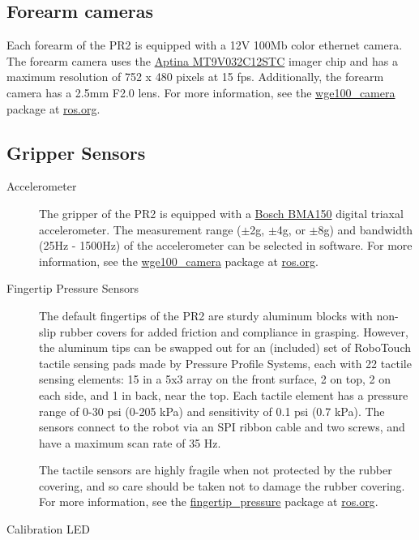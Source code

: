 \subsection{Forearm cameras}
Each forearm of the PR2 is equipped with a 12V 100Mb color ethernet camera. The
forearm camera uses the
\href{http://www.aptina.com/products/image_sensors/mt9v032c12stc/#overview}{Aptina
  MT9V032C12STC} imager chip and has a maximum resolution of 752 x 480 pixels at
15 fps. Additionally, the forearm camera has a 2.5mm F2.0 lens.  For more
information, see the
\href{http://www.ros.org/wiki/wge100_camera}{wge100\_camera} package at
\href{http://www.ros.org}{ros.org}.

\subsection{Gripper Sensors}
\begin{description}

\item[Accelerometer] The gripper of the PR2 is equipped with a
  \href{http://www.bosch-sensortec.com/content/language1/html/3474.htm}{Bosch
    BMA150} digital triaxal accelerometer. The measurement range ($\pm$2g,
  $\pm$4g, or $\pm$8g) and bandwidth (25Hz - 1500Hz) of the accelerometer can be
  selected in software. For more information, see the
  \href{http://www.ros.org/wiki/wge100_camera}{wge100\_camera} package at
  \href{http://www.ros.org}{ros.org}.

\item[Fingertip Pressure Sensors] The default fingertips of the PR2 are sturdy
  aluminum blocks with non-slip rubber covers for added friction and compliance
  in grasping.  However, the aluminum tips can be swapped out for an (included)
  set of RoboTouch tactile sensing pads made by Pressure Profile Systems, each
  with 22 tactile sensing elements: 15 in a 5x3 array on the front surface, 2 on
  top, 2 on each side, and 1 in back, near the top.  Each tactile element has a
  pressure range of 0-30 psi (0-205 kPa) and sensitivity of 0.1 psi (0.7 kPa).
  The sensors connect to the robot via an SPI ribbon cable and two screws, and
  have a maximum scan rate of 35 Hz.

The tactile sensors are highly fragile when not protected by the rubber
covering, and so care should be taken not to damage the rubber covering.  For
more information, see the
\href{http://www.ros.org/wiki/fingertip\_pressure}{fingertip\_pressure} package
at \href{http://ros.org}{ros.org}.

\item[Calibration LED]

\end{description}

